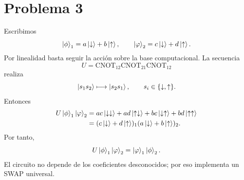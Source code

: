 \documentclass[11pt,a4paper]{article}
\numberwithin{equation}{section}
\renewcommand{\boxed}[1]{#1}
\begin{document}
\section{Problema 3}
Escribimos
\begin{equation}
\ket\phi_1=a\ket\downarrow+b\ket\uparrow,\qquad
\ket\varphi_2=c\ket\downarrow+d\ket\uparrow.
\end{equation}
Por linealidad basta seguir la acción sobre la base computacional. La secuencia
\begin{equation}
U=\mathrm{CNOT}_{12}\mathrm{CNOT}_{21}\mathrm{CNOT}_{12}
\end{equation}
realiza
\begin{equation}
\ket{s_1s_2}\longmapsto\ket{s_2s_1},\qquad s_i\in\{\downarrow,\uparrow\}.
\end{equation}
Entonces
\begin{align}
U\ket\phi_1\ket\varphi_2
&=ac\ket{\downarrow\downarrow}+ad\ket{\uparrow\downarrow}
+bc\ket{\downarrow\uparrow}+bd\ket{\uparrow\uparrow}\\
&=(c\ket\downarrow+d\ket\uparrow)_1
(a\ket\downarrow+b\ket\uparrow)_2.
\end{align}
Por tanto,
\begin{equation}
\boxed{U\ket\phi_1\ket\varphi_2=\ket\varphi_1\ket\phi_2.}
\end{equation}
El circuito no depende de los coeficientes desconocidos; por eso implementa un SWAP universal.
\end{document}
